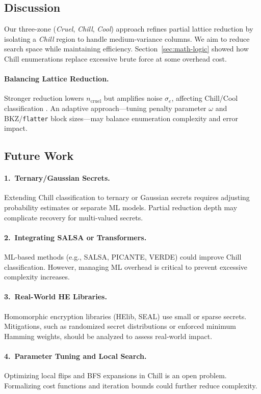 \documentclass[conference]{IEEEtran}
\begin{document}
\subsection{Discussion}
Our three-zone (\emph{Cruel}, \emph{Chill}, \emph{Cool}) approach refines partial lattice reduction by isolating a \emph{Chill} region to handle medium-variance columns. We aim to reduce search space while maintaining efficiency. Section~\ref{sec:math-logic} showed how Chill enumerations replace excessive brute force at some overhead cost.

\paragraph{Balancing Lattice Reduction.}
Stronger reduction lowers $n_{\mathrm{cruel}}$ but amplifies noise $\sigma_e$, affecting Chill/Cool classification \cite{cool-and-cruel}. An adaptive approach—tuning penalty parameter $\omega$ and BKZ/\texttt{flatter} block sizes—may balance enumeration complexity and error impact.

\subsection{Future Work}
\paragraph{1.\ Ternary/Gaussian Secrets.}
Extending Chill classification to ternary or Gaussian secrets requires adjusting probability estimates or separate ML models. Partial reduction depth may complicate recovery for multi-valued secrets.

\paragraph{2.\ Integrating SALSA or Transformers.}
ML-based methods (e.g., SALSA, PICANTE, VERDE) could improve Chill classification. However, managing ML overhead is critical to prevent excessive complexity increases.

\paragraph{3.\ Real-World HE Libraries.}
Homomorphic encryption libraries (HElib, SEAL) use small or sparse secrets. Mitigations, such as randomized secret distributions or enforced minimum Hamming weights, should be analyzed to assess real-world impact.

\paragraph{4.\ Parameter Tuning and Local Search.}
Optimizing local flips and BFS expansions in Chill is an open problem. Formalizing cost functions and iteration bounds could further reduce complexity.
\end{document}

